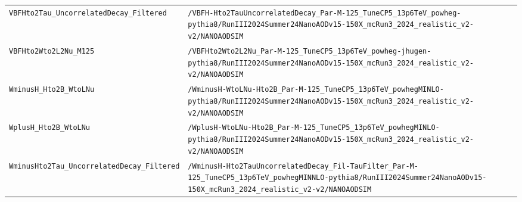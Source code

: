 \begin{longtable}{@{}>{\RaggedRight\arraybackslash}p{} >{\RaggedRight\arraybackslash}p{}@{}}
\addlinespace[2pt]
\texttt{VBFHto2Tau\_\allowbreak{}UncorrelatedDecay\_\allowbreak{}Filtered} & \texttt{/\allowbreak{}VBFH-\allowbreak{}Hto2TauUncorrelatedDecay\_\allowbreak{}Par-\allowbreak{}M-\allowbreak{}125\_\allowbreak{}TuneCP5\_\allowbreak{}13p6TeV\_\allowbreak{}powheg-\allowbreak{}pythia8/\allowbreak{}RunIII2024Summer24NanoAODv15-\allowbreak{}150X\_\allowbreak{}mcRun3\_\allowbreak{}2024\_\allowbreak{}realistic\_\allowbreak{}v2-\allowbreak{}v2/\allowbreak{}NANOAODSIM} \\
\addlinespace[2pt]
\texttt{VBFHto2Wto2L2Nu\_\allowbreak{}M125} & \texttt{/\allowbreak{}VBFHto2Wto2L2Nu\_\allowbreak{}Par-\allowbreak{}M-\allowbreak{}125\_\allowbreak{}TuneCP5\_\allowbreak{}13p6TeV\_\allowbreak{}powheg-\allowbreak{}jhugen-\allowbreak{}pythia8/\allowbreak{}RunIII2024Summer24NanoAODv15-\allowbreak{}150X\_\allowbreak{}mcRun3\_\allowbreak{}2024\_\allowbreak{}realistic\_\allowbreak{}v2-\allowbreak{}v2/\allowbreak{}NANOAODSIM} \\
\addlinespace[2pt]
\texttt{WminusH\_\allowbreak{}Hto2B\_\allowbreak{}WtoLNu} & \texttt{/\allowbreak{}WminusH-\allowbreak{}WtoLNu-\allowbreak{}Hto2B\_\allowbreak{}Par-\allowbreak{}M-\allowbreak{}125\_\allowbreak{}TuneCP5\_\allowbreak{}13p6TeV\_\allowbreak{}powhegMINLO-\allowbreak{}pythia8/\allowbreak{}RunIII2024Summer24NanoAODv15-\allowbreak{}150X\_\allowbreak{}mcRun3\_\allowbreak{}2024\_\allowbreak{}realistic\_\allowbreak{}v2-\allowbreak{}v2/\allowbreak{}NANOAODSIM} \\
\addlinespace[2pt]
\texttt{WplusH\_\allowbreak{}Hto2B\_\allowbreak{}WtoLNu} & \texttt{/\allowbreak{}WplusH-\allowbreak{}WtoLNu-\allowbreak{}Hto2B\_\allowbreak{}Par-\allowbreak{}M-\allowbreak{}125\_\allowbreak{}TuneCP5\_\allowbreak{}13p6TeV\_\allowbreak{}powhegMINLO-\allowbreak{}pythia8/\allowbreak{}RunIII2024Summer24NanoAODv15-\allowbreak{}150X\_\allowbreak{}mcRun3\_\allowbreak{}2024\_\allowbreak{}realistic\_\allowbreak{}v2-\allowbreak{}v2/\allowbreak{}NANOAODSIM} \\
\addlinespace[2pt]
\texttt{WminusHto2Tau\_\allowbreak{}UncorrelatedDecay\_\allowbreak{}Filtered} & \texttt{/\allowbreak{}WminusH-\allowbreak{}Hto2TauUncorrelatedDecay\_\allowbreak{}Fil-\allowbreak{}TauFilter\_\allowbreak{}Par-\allowbreak{}M-\allowbreak{}125\_\allowbreak{}TuneCP5\_\allowbreak{}13p6TeV\_\allowbreak{}powhegMINNLO-\allowbreak{}pythia8/\allowbreak{}RunIII2024Summer24NanoAODv15-\allowbreak{}150X\_\allowbreak{}mcRun3\_\allowbreak{}2024\_\allowbreak{}realistic\_\allowbreak{}v2-\allowbreak{}v2/\allowbreak{}NANOAODSIM} \\

\end{longtable}
